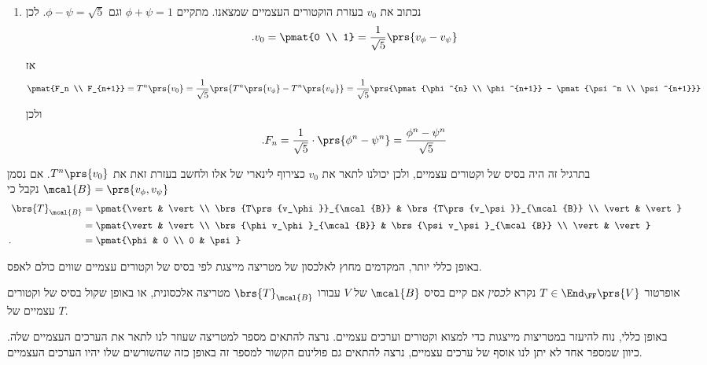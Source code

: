 \documentclass[a4paper,10pt,twoside,openany]{book}
\begin{document}
\begin{solution}
\begin{enumerate}
\item
נכתוב את
$v_0$
בעזרת הוקטורים העצמיים שמצאנו.
מתקיים
$\phi + \psi = 1$
וגם
$\phi - \psi = \sqrt{5}$.
לכן
\begin{align*}
\text{.} v_0 = \pmat{0 \\ 1} = \frac{1}{\sqrt{5}} \prs{v_\phi - v_\psi}
\end{align*}
אז
\begin{align*}
\pmat{F_n \\ F_{n+1}} = T^n\prs{v_0} = \frac{1}{\sqrt{5}} \prs{T^n\prs{v_\phi} - T^n\prs{v_\psi}} = \frac{1}{\sqrt{5}} \prs{\pmat{\phi^{n} \\ \phi^{n+1}} - \pmat{\psi^n \\ \psi^{n+1}}}
\end{align*}
ולכן
\begin{align*}
\text{.} F_n = \frac{1}{\sqrt{5}} \cdot \prs{\phi^n - \psi^n} = \frac{\phi^n - \psi^n}{\sqrt{5}}
\end{align*}
\end{enumerate}
\end{solution}

בתרגיל זה היה בסיס של וקטורים עצמיים, ולכן יכולנו לתאר את
$v_0$
כצירוף לינארי של אלו ולחשב בעזרת זאת את
$T^n\prs{v_0}$.
אם נסמן
$\mcal{B} = \prs{v_\phi, v_\psi}$
נקבל כי
\begin{align*}
\brs{T}_{\mcal{B}} &= \pmat{\vert & \vert \\ \brs{T\prs{v_\phi}}_{\mcal{B}} & \brs{T\prs{v_\psi}}_{\mcal{B}} \\
\vert & \vert}
\\&=
\pmat{\vert & \vert \\ \brs{\phi v_\phi}_{\mcal{B}} & \brs{\psi v_\psi}_{\mcal{B}} \\
\vert & \vert}
\\ \text{.} \hphantom{\brs{T}_{\mcal{B}}} &=
\pmat{\phi & 0 \\ 0 & \psi}
\end{align*}

באופן כללי יותר, המקדמים מחוץ לאלכסון של מטריצה מייצגת לפי בסיס של וקטורים עצמיים שווים כולם לאפס.

\begin{definition}
אופרטור
$T \in \End_\FF\prs{V}$
נקרא
\emph{לכסין}
אם קיים בסיס
$\mcal{B}$
של
$V$
עבורו
$\brs{T}_{\mcal{B}}$
מטריצה אלכסונית, או באופן שקול בסיס של וקטורים עצמיים של
$T$.
\end{definition}

באופן כללי, נוח להיעזר במטריצות מייצגות כדי למצוא וקטורים וערכים עצמיים. נרצה להתאים מספר למטריצה שעוזר לנו לתאר את הערכים העצמיים שלה. כיוון שמספר אחד לא יתן לנו אוסף של ערכים עצמיים, נרצה להתאים גם פולינום הקשור למספר זה באופן כזה שהשורשים שלו יהיו הערכים העצמיים.
\end{document}
